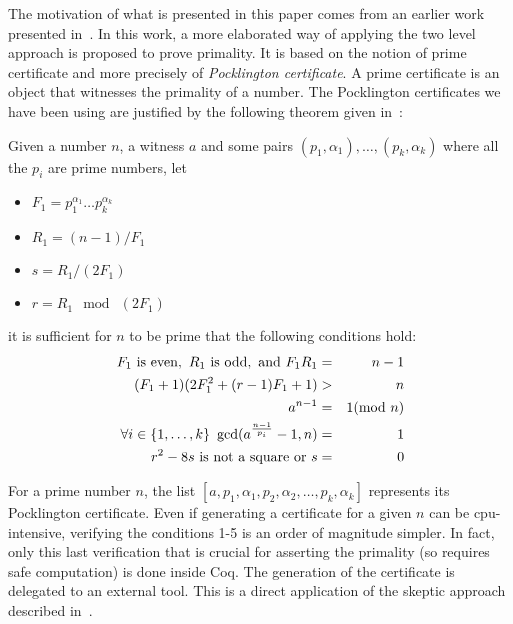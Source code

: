 The motivation of what is presented in this paper comes from an earlier work 
presented in~\cite{GreTheWer}. In this work, a more elaborated way of applying 
the two level approach is proposed to prove primality. It is based on the
notion of prime certificate and more precisely of {\it Pocklington certificate}.
A prime certificate is an object that witnesses the primality of a number.
The Pocklington certificates we have been using are justified by the following
theorem given in~\cite{lehmer}:
\begin{theorem}
Given a number $n$, a witness $a$ and some pairs $(p_1,\alpha_1),\dots,(p_k,\alpha_k)$
 where all the $p_i$ are prime numbers,
 let
 \begin{itemize}
\item[]$F_1 = p_1^{\alpha_1}\dots p_k^{\alpha_k}$
\item[]$R_1 = (n - 1) / F_1$
\item[]$ s = R_1 / (2F_1)$
\item[] $r = R_1 \mod\ (2F_1)$
 \end{itemize}
 it is sufficient for $n$ to be prime that the following conditions hold:
\begin{eqnarray}
F_1 \,\,\hbox{is even},\,\,
R_1 \,\, \hbox{is odd}, \,\,\hbox{and}\,\,
F_1R_1  &=&  n -1\\
(F_1 + 1) (2F_1^2 + (r - 1) F_1 + 1) & >& n\\
a^{n-1} &=& 1 (\mod\ n)\\
\forall i\in\{1,\dots,k\}~\gcd(a^{\frac{n-1}{p_i}}-1,n)&=&1\\
r^2 - 8 s\,\,\mbox{is not a square}\,\,\hbox{or}\,\,s &=& 0
\end{eqnarray}
\end{theorem}
For a prime number $n$, the list $[a, p_1, \alpha_1, p_2, \alpha_2, \dots, p_k, \alpha_k]$
represents its Pocklington certificate.
Even if generating a certificate for a given $n$ can be cpu-intensive, verifying
the conditions 1-5 is an order of magnitude simpler. In fact, only
this last verification that is crucial for asserting the primality (so requires
safe computation) is done inside {\sc Coq}.
The generation of the certificate is delegated to an external tool.
This is a direct application of the skeptic approach described in~\cite{BarBar,HarThe}.
                 
